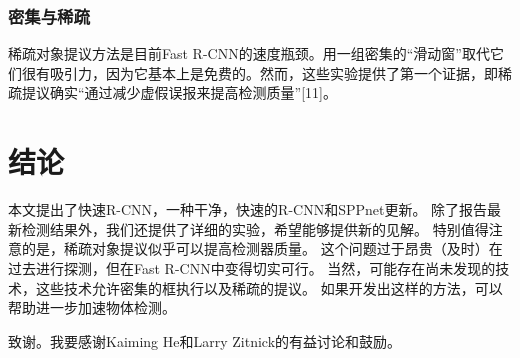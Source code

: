 \subsubsection{密集与稀疏}
\par 稀疏对象提议方法是目前Fast R-CNN的速度瓶颈。用一组密集的“滑动窗”取代它们很有吸引力，因为它基本上是免费的。然而，这些实验提供了第一个证据，即稀疏提议确实“通过减少虚假误报来提高检测质量”[11]。

\section{结论}
\par 本文提出了快速R-CNN，一种干净，快速的R-CNN和SPPnet更新。 除了报告最新检测结果外，我们还提供了详细的实验，希望能够提供新的见解。 特别值得注意的是，稀疏对象提议似乎可以提高检测器质量。 这个问题过于昂贵（及时）在过去进行探测，但在Fast R-CNN中变得切实可行。 当然，可能存在尚未发现的技术，这些技术允许密集的框执行以及稀疏的提议。 如果开发出这样的方法，可以帮助进一步加速物体检测。
\par 致谢。我要感谢Kaiming He和Larry Zitnick的有益讨论和鼓励。

